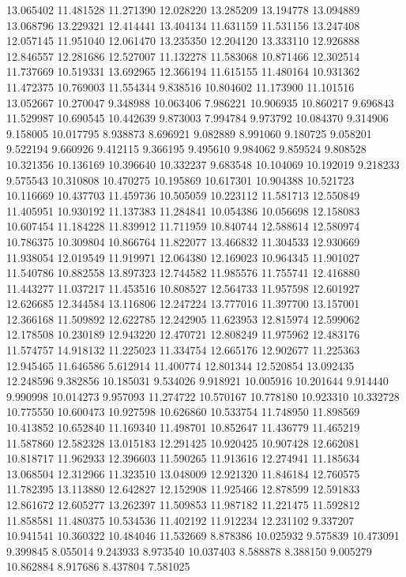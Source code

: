 13.065402
11.481528
11.271390
12.028220
13.285209
13.194778
13.094889
13.068796
13.229321
12.414441
13.404134
11.631159
11.531156
13.247408
12.057145
11.951040
12.061470
13.235350
12.204120
13.333110
12.926888
12.846557
12.281686
12.527007
11.132278
11.583068
10.871466
12.302514
11.737669
10.519331
13.692965
12.366194
11.615155
11.480164
10.931362
11.472375
10.769003
11.554344
9.838516
10.804602
11.173900
11.101516
13.052667
10.270047
9.348988
10.063406
7.986221
10.906935
10.860217
9.696843
11.529987
10.690545
10.442639
9.873003
7.994784
9.973792
10.084370
9.314906
9.158005
10.017795
8.938873
8.696921
9.082889
8.991060
9.180725
9.058201
9.522194
9.660926
9.412115
9.366195
9.495610
9.984062
9.859524
9.808528
10.321356
10.136169
10.396640
10.332237
9.683548
10.104069
10.192019
9.218233
9.575543
10.310808
10.470275
10.195869
10.617301
10.904388
10.521723
10.116669
10.437703
11.459736
10.505059
10.223112
11.581713
12.550849
11.405951
10.930192
11.137383
11.284841
10.054386
10.056698
12.158083
10.607454
11.184228
11.839912
11.711959
10.840744
12.588614
12.580974
10.786375
10.309804
10.866764
11.822077
13.466832
11.304533
12.930669
11.938054
12.019549
11.919971
12.064380
12.169023
10.964345
11.901027
11.540786
10.882558
13.897323
12.744582
11.985576
11.755741
12.416880
11.443277
11.037217
11.453516
10.808527
12.564733
11.957598
12.601927
12.626685
12.344584
13.116806
12.247224
13.777016
11.397700
13.157001
12.366168
11.509892
12.622785
12.242905
11.623953
12.815974
12.599062
12.178508
10.230189
12.943220
12.470721
12.808249
11.975962
12.483176
11.574757
14.918132
11.225023
11.334754
12.665176
12.902677
11.225363
12.945465
11.646586
5.612914
11.400774
12.801344
12.520854
13.092435
12.248596
9.382856
10.185031
9.534026
9.918921
10.005916
10.201644
9.914440
9.990998
10.014273
9.957093
11.274722
10.570167
10.778180
10.923310
10.332728
10.775550
10.600473
10.927598
10.626860
10.533754
11.748950
11.898569
10.413852
10.652840
11.169340
11.498701
10.852647
11.436779
11.465219
11.587860
12.582328
13.015183
12.291425
10.920425
10.907428
12.662081
10.818717
11.962933
12.396603
11.590265
11.913616
12.274941
11.185634
13.068504
12.312966
11.323510
13.048009
12.921320
11.846184
12.760575
11.782395
13.113880
12.642827
12.152908
11.925466
12.878599
12.591833
12.861672
12.605277
13.262397
11.509853
11.987182
11.221475
11.592812
11.858581
11.480375
10.534536
11.402192
11.912234
12.231102
9.337207
10.941541
10.360322
10.484046
11.532669
8.878386
10.025932
9.575839
10.473091
9.399845
8.055014
9.243933
8.973540
10.037403
8.588878
8.388150
9.005279
10.862884
8.917686
8.437804
7.581025
